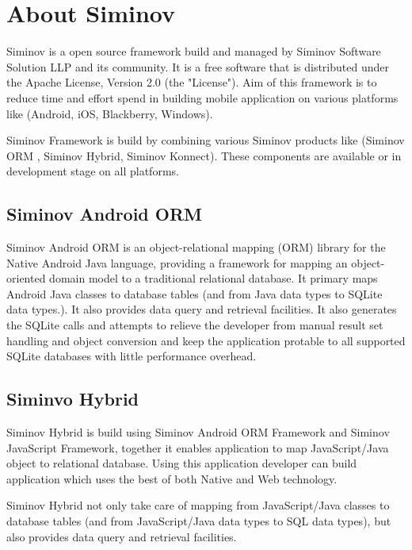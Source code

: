 \newpage
\chapter {\Large{About Siminov}}

Siminov is a open source framework build and managed by Siminov Software Solution LLP and its community. It is a free software that is distributed under the Apache License, Version 2.0 (the "License"). Aim of this framework is to reduce time and effort spend in building mobile application on various platforms like (Android, iOS, Blackberry, Windows).

Siminov Framework is build by combining various Siminov products like (Siminov ORM , Siminov Hybrid, Siminov Konnect). These components are available or in development stage on all platforms.

\section{Siminov Android ORM}
Siminov Android ORM is an object-relational mapping (ORM) library for the Native Android Java language, providing a framework for mapping an object-oriented domain model to a traditional relational database. It primary maps Android Java classes to database tables (and from Java data types to SQLite data types.). It also provides data query and retrieval facilities. It also generates the SQLite calls and attempts to relieve the developer from manual result set handling and object conversion and keep the application protable to all supported SQLite databases with little performance overhead.


\section{Siminvo Hybrid}
Siminov Hybrid is build using Siminov Android ORM Framework and Siminov JavaScript Framework, together it enables application to map JavaScript/Java object to relational database. Using this application developer can build application which uses the best of both Native and Web technology.

Siminov Hybrid not only take care of mapping from JavaScript/Java  classes to database tables (and from JavaScript/Java data types to SQL data types), but also provides data query and retrieval facilities.

